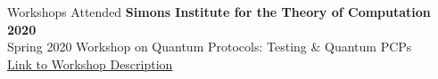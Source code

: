 \documentclass{resume} %
\begin{document}
\begin{rSection}{Workshops Attended}
{\bf Simons Institute for the Theory of Computation} \hfill {\bf 2020} \\
Spring 2020 Workshop on Quantum Protocols: Testing \& Quantum PCPs \\
\href{https://simons.berkeley.edu/workshops/quantum-2020-2}{Link to Workshop Description}
\end{rSection}
\end{document}
